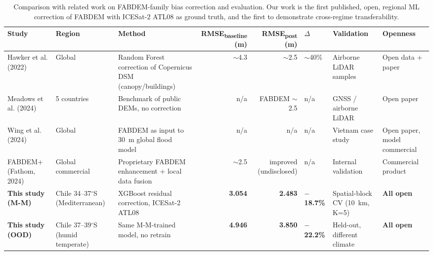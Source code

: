 \begin{table}[t]
\centering
\caption{Comparison with related work on FABDEM-family bias correction and evaluation. Our work is the first published, open, regional ML correction of FABDEM with ICESat-2 ATL08 as ground truth, and the first to demonstrate cross-regime transferability.}
\label{tab:literature}
\footnotesize
\begin{tabular}{p{2.7cm}p{2.6cm}p{3.5cm}rrlp{2.7cm}p{2.2cm}}
\toprule
\textbf{Study} & \textbf{Region} & \textbf{Method} & \textbf{RMSE\textsubscript{baseline} (m)} & \textbf{RMSE\textsubscript{post} (m)} & \textbf{$\Delta$} & \textbf{Validation} & \textbf{Openness} \\
\midrule
Hawker et al. (2022) & Global & Random Forest correction of Copernicus DSM (canopy/buildings) & $\sim$4.3 & $\sim$2.5 & $\sim$40\% & Airborne LiDAR samples & Open data + paper \\
Meadows et al. (2024) & 5 countries & Benchmark of public DEMs, no correction & n/a & FABDEM $\sim$2.5 & n/a & GNSS / airborne LiDAR & Open paper \\
Wing et al. (2024) & Global & FABDEM as input to 30~m global flood model & n/a & n/a & n/a & Vietnam case study & Open paper, model commercial \\
FABDEM+ (Fathom, 2024) & Global commercial & Proprietary FABDEM enhancement + local data fusion & $\sim$2.5 & improved (undisclosed) & n/a & Internal validation & Commercial product \\
\textbf{This study (M-M)} & Chile 34--37$^{\circ}$S (Mediterranean) & XGBoost residual correction, ICESat-2 ATL08 & \textbf{3.054} & \textbf{2.483} & \textbf{$-$18.7\%} & Spatial-block CV (10~km, K=5) & \textbf{All open} \\
\textbf{This study (OOD)} & Chile 37--39$^{\circ}$S (humid temperate) & Same M-M-trained model, no retrain & \textbf{4.946} & \textbf{3.850} & \textbf{$-$22.2\%} & Held-out, different climate & \textbf{All open} \\
\bottomrule
\end{tabular}
\end{table}

